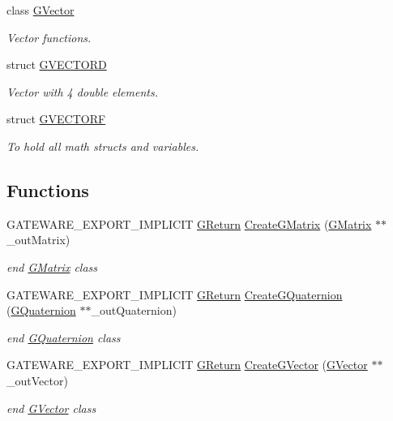 \begin{DoxyCompactItemize}
class \mbox{\hyperlink{classGW_1_1MATH_1_1GVector}{G\+Vector}}
\begin{DoxyCompactList}\small\item\em Vector functions. \end{DoxyCompactList}\item 
struct \mbox{\hyperlink{structGW_1_1MATH_1_1GVECTORD}{G\+V\+E\+C\+T\+O\+RD}}
\begin{DoxyCompactList}\small\item\em Vector with 4 double elements. \end{DoxyCompactList}\item 
struct \mbox{\hyperlink{structGW_1_1MATH_1_1GVECTORF}{G\+V\+E\+C\+T\+O\+RF}}
\begin{DoxyCompactList}\small\item\em To hold all math structs and variables. \end{DoxyCompactList}\end{DoxyCompactItemize}
\subsection*{Functions}
\begin{DoxyCompactItemize}
\item 
G\+A\+T\+E\+W\+A\+R\+E\+\_\+\+E\+X\+P\+O\+R\+T\+\_\+\+I\+M\+P\+L\+I\+C\+IT \mbox{\hyperlink{namespaceGW_a67a839e3df7ea8a5c5686613a7a3de21}{G\+Return}} \mbox{\hyperlink{namespaceGW_1_1MATH_a32e9bb10a0b5fc1b730822ee510d6ce1}{Create\+G\+Matrix}} (\mbox{\hyperlink{classGW_1_1MATH_1_1GMatrix}{G\+Matrix}} $\ast$$\ast$\+\_\+out\+Matrix)
\begin{DoxyCompactList}\small\item\em end \mbox{\hyperlink{classGW_1_1MATH_1_1GMatrix}{G\+Matrix}} class \end{DoxyCompactList}\item 
G\+A\+T\+E\+W\+A\+R\+E\+\_\+\+E\+X\+P\+O\+R\+T\+\_\+\+I\+M\+P\+L\+I\+C\+IT \mbox{\hyperlink{namespaceGW_a67a839e3df7ea8a5c5686613a7a3de21}{G\+Return}} \mbox{\hyperlink{namespaceGW_1_1MATH_a1cb97726e251c442ce358c884f3498a0}{Create\+G\+Quaternion}} (\mbox{\hyperlink{classGW_1_1MATH_1_1GQuaternion}{G\+Quaternion}} $\ast$$\ast$\+\_\+out\+Quaternion)
\begin{DoxyCompactList}\small\item\em end \mbox{\hyperlink{classGW_1_1MATH_1_1GQuaternion}{G\+Quaternion}} class \end{DoxyCompactList}\item 
G\+A\+T\+E\+W\+A\+R\+E\+\_\+\+E\+X\+P\+O\+R\+T\+\_\+\+I\+M\+P\+L\+I\+C\+IT \mbox{\hyperlink{namespaceGW_a67a839e3df7ea8a5c5686613a7a3de21}{G\+Return}} \mbox{\hyperlink{namespaceGW_1_1MATH_a32dfb827d42ce2d17ed6b4b0e70e4215}{Create\+G\+Vector}} (\mbox{\hyperlink{classGW_1_1MATH_1_1GVector}{G\+Vector}} $\ast$$\ast$\+\_\+out\+Vector)
\begin{DoxyCompactList}\small\item\em end \mbox{\hyperlink{classGW_1_1MATH_1_1GVector}{G\+Vector}} class \end{DoxyCompactList}\end{DoxyCompactItemize}


